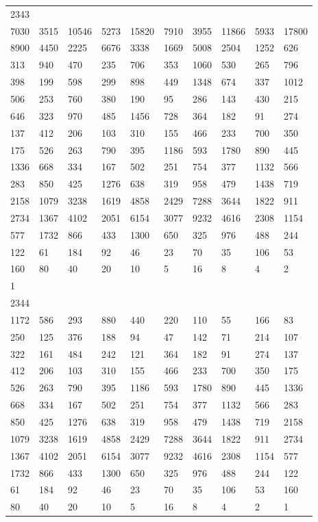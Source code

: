 \begin{longtable}{*{10}{l}}
2343&&&&&&&&&\\
7030& 3515& 10546& 5273& 15820& 7910& 3955& 11866& 5933& 17800\\
8900& 4450& 2225& 6676& 3338& 1669& 5008& 2504& 1252& 626\\
313& 940& 470& 235& 706& 353& 1060& 530& 265& 796\\
398& 199& 598& 299& 898& 449& 1348& 674& 337& 1012\\
506& 253& 760& 380& 190& 95& 286& 143& 430& 215\\
646& 323& 970& 485& 1456& 728& 364& 182& 91& 274\\
137& 412& 206& 103& 310& 155& 466& 233& 700& 350\\
175& 526& 263& 790& 395& 1186& 593& 1780& 890& 445\\
1336& 668& 334& 167& 502& 251& 754& 377& 1132& 566\\
283& 850& 425& 1276& 638& 319& 958& 479& 1438& 719\\
2158& 1079& 3238& 1619& 4858& 2429& 7288& 3644& 1822& 911\\
2734& 1367& 4102& 2051& 6154& 3077& 9232& 4616& 2308& 1154\\
577& 1732& 866& 433& 1300& 650& 325& 976& 488& 244\\
122& 61& 184& 92& 46& 23& 70& 35& 106& 53\\
160& 80& 40& 20& 10& 5& 16& 8& 4& 2\\
1& \\

2344&&&&&&&&&\\
1172& 586& 293& 880& 440& 220& 110& 55& 166& 83\\
250& 125& 376& 188& 94& 47& 142& 71& 214& 107\\
322& 161& 484& 242& 121& 364& 182& 91& 274& 137\\
412& 206& 103& 310& 155& 466& 233& 700& 350& 175\\
526& 263& 790& 395& 1186& 593& 1780& 890& 445& 1336\\
668& 334& 167& 502& 251& 754& 377& 1132& 566& 283\\
850& 425& 1276& 638& 319& 958& 479& 1438& 719& 2158\\
1079& 3238& 1619& 4858& 2429& 7288& 3644& 1822& 911& 2734\\
1367& 4102& 2051& 6154& 3077& 9232& 4616& 2308& 1154& 577\\
1732& 866& 433& 1300& 650& 325& 976& 488& 244& 122\\
61& 184& 92& 46& 23& 70& 35& 106& 53& 160\\
80& 40& 20& 10& 5& 16& 8& 4& 2& 1\\


\end{longtable}
